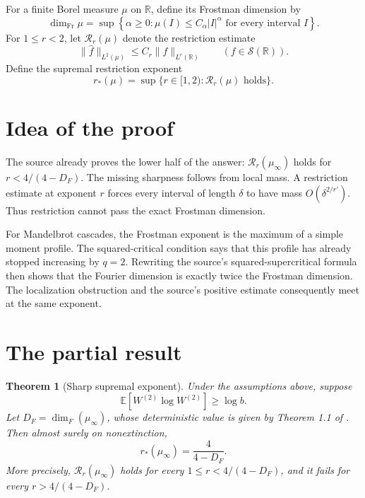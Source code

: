 \documentclass[11pt]{article}
\newtheorem{theorem}{Theorem}
\newcommand{\E}{\mathbb E}
\newcommand{\R}{\mathbb R}
\newcommand{\muinf}{\mu_\infty}
\begin{document}
For a finite Borel measure \(\mu\) on \(\R\), define its Frostman dimension by
\[
 \dim_{\mathrm{Fr}}\mu
 =\sup\left\{\alpha\geq0:
 \mu(I)\leq C_\alpha |I|^\alpha
 \text{ for every interval }I\right\}.
\]
For \(1\leq r<2\), let \(\mathcal R_r(\mu)\) denote the restriction estimate
\[
 \|\widehat f\|_{L^2(\mu)}\leq C_r\|f\|_{L^r(\R)}
 \qquad(f\in\mathcal S(\R)).
\]
Define the supremal restriction exponent
\[
 r_*(\mu)=\sup\{r\in[1,2):\mathcal R_r(\mu)\text{ holds}\}.
\]

\section{Idea of the proof}

The source already proves the lower half of the answer:
\(\mathcal R_r(\muinf)\) holds for
\(r<4/(4-D_F)\).  The missing sharpness follows from local mass.
A restriction estimate at exponent \(r\) forces every interval of length
\(\delta\) to have mass \(O(\delta^{2/r'})\).  Thus restriction cannot pass
the exact Frostman dimension.

For Mandelbrot cascades, the Frostman exponent is the maximum of a simple
moment profile.  The squared-critical condition says that this profile has
already stopped increasing by \(q=2\).  Rewriting the source's
squared-supercritical formula then shows that the Fourier dimension is
exactly twice the Frostman dimension.  The localization obstruction and the
source's positive estimate consequently meet at the same exponent.

\section{The partial result}

\begin{theorem}[Sharp supremal exponent]\label{thm:main}
Under the assumptions above, suppose
\[
 \E[W^{(2)}\log W^{(2)}]\geq\log b.
\]
Let \(D_F=\dim_F(\muinf)\), whose deterministic value is given by
Theorem 1.1 of \cite{CHQW}.  Then almost surely on nonextinction,
\[
 r_*(\muinf)=\frac{4}{4-D_F}.
\]
More precisely, \(\mathcal R_r(\muinf)\) holds for every
\(1\leq r<4/(4-D_F)\), and it fails for every
\(r>4/(4-D_F)\).
\end{theorem}
\end{document}
